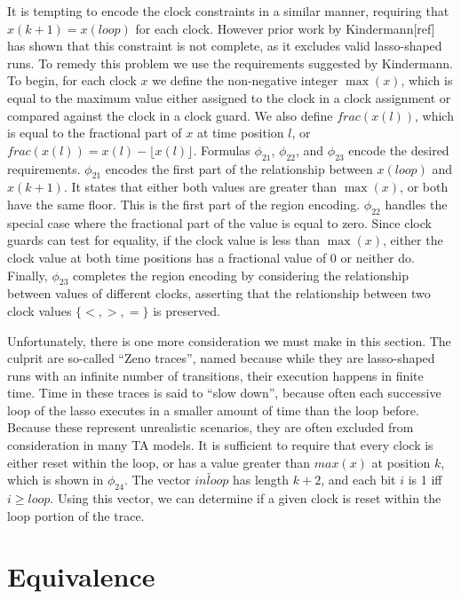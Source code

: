 \documentclass[a4paper,12pt]{article}
\begin{document}
It is tempting to encode the clock constraints in a similar manner, requiring
that \(x(k+1) = x(loop)\) for each clock. However prior work by Kindermann[ref]
has shown that this constraint is not complete, as it excludes valid
lasso-shaped runs. To remedy this problem we use the requirements suggested by
Kindermann. To begin, for each clock \(x\) we define the non-negative integer
\(\max(x)\), which is equal to the maximum value either assigned to the clock in
a clock assignment or compared against the clock in a clock guard. We also
define \(frac(x(l))\), which is equal to the fractional part of \(x\) at time
position \(l\), or \(frac(x(l)) = x(l) - \lfloor x(l) \rfloor\). Formulas
\(\phi_{21}\), \(\phi_{22}\), and \(\phi_{23}\) encode the desired requirements.
\(\phi_{21}\) encodes the first part of the relationship between \(x(loop)\) and
\(x(k+1)\). It states that either both values are greater than \(\max(x)\), or
both have the same floor. This is the first part of the region encoding.
\(\phi_{22}\) handles the special case where the fractional part of the value is
equal to zero. Since clock guards can test for equality, if the clock value is
less than \(\max(x)\), either the clock value at both time positions has a
fractional value of 0 or neither do. Finally, \(\phi_{23}\) completes the region
encoding by considering the relationship between values of different clocks,
asserting that the relationship between two clock values \(\{<,>,=\}\) is
preserved.

Unfortunately, there is one more consideration we must make in this section. The
culprit are so-called ``Zeno traces'', named because while they are lasso-shaped
runs with an infinite number of transitions, their execution happens in finite
time. Time in these traces is said to ``slow down'', because often each successive
loop of the lasso executes in a smaller amount of time than the loop before.
Because these represent unrealistic scenarios, they are often excluded from
consideration in many TA models. It is sufficient to require that every clock is
either reset within the loop, or has a value greater than \(max(x)\) at position
\(k\), which is shown in \(\phi_{24}\). The vector \(\overleftarrow{inloop}\)
has length \(k+2\), and each bit \(i\) is 1 iff \(i \geq loop\). Using this
vector, we can determine if a given clock is reset within the loop portion of
the trace.

\section{Equivalence}\label{equivalence}
\end{document}
